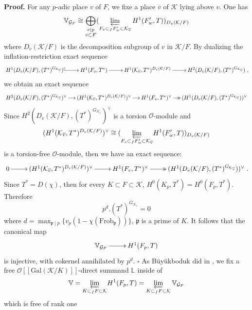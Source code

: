 \documentclass[reqno]{amsart}
\begin{document}
 \noindent \textbf{Proof.} For any $p$-adic place $v$ of $F$, we
fixe a place $\overline{v}$ of $\mathcal{K}$ lying above $v$.
One has
$$
\mathbb{V}_{\mathcal{G}_{F}}\cong\bigoplus_{\substack {v\mid p\\
v\subset F}} (\varprojlim_{F_{v}\subset_{f}F^{\prime}_{w}\subset
\mathcal{K}_{\overline{v}}}H^{1}(F^{\prime}_{w},T))_{D_{v}(\mathcal{K}/F)}
$$
where $D_{v}(\mathcal{K}/F)$ is the decomposition subgroup of $v$ in
$\mathcal{K}/F$. By dualizing the inflation-restriction exact
sequence
$$
\xymatrix@=2pc{H^{1}(D_{v}(\mathcal{K}/F),(T^{\ast})^{G_{\mathcal{K}_{\overline{v}}}})\ar@{^{(}->}[r]&H^{1}(F_{v},T^{\ast})\ar[r]&
H^{1}(\mathcal{K}_{\overline{v}},T^{\ast})^{D_{v}(\mathcal{K}/F)}\ar[r]&H^{2}(D_{v}(\mathcal{K}/F),(T^{\ast})^{G_{\mathcal{K}_{\overline{v}}}})},
$$
we obtain an exact sequence
$$
\xymatrix@=1pc{H^{2}(D_{v}(\mathcal{K}/F),(T^{\ast})^{G_{\mathcal{K}_{\overline{v}}}})^{\vee}\ar[r]&
(H^{1}(\mathcal{K}_{\overline{v}},T^{\ast})^{D_{v}(\mathcal{K}/F)})^{\vee}\ar[r]&
H^{1}(F_{v},T^{\ast})^{\vee}\ar@{->>}[r]&
(H^{1}(D_{v}(\mathcal{K}/F),(T^{\ast})^{G_{\mathcal{K}_{\overline{v}}}}))^{\vee}}
$$
Since
$H^{2}(D_{v}(\mathcal{K}/F),(T^{\ast})^{G_{\mathcal{K}_{\overline{v}}}})^{\vee}$
is a torsion $\mathcal{O}$-module and
$$
(H^{1}(\mathcal{K}_{\overline{v}},T^{\ast})^{D_{v}(\mathcal{K}/F)})^{\vee}\cong
(\displaystyle{\varprojlim_{ F_{v}\subset_{f}F^{\prime}_{w}\subset
\mathcal{K}_{\overline{v}}}}H^{1}(F^{\prime}_{w},T))_{D_{v}(\mathcal{K}/F)}
$$
is a torsion-free $\mathcal{O}$-module, then we have an exact
sequence:
$$
\xymatrix@=2pc{0\ar[r]&
(H^{1}(\mathcal{K}_{\overline{v}},T^{\ast})^{D_{v}(\mathcal{K}/F)})^{\vee}\ar[r]&
H^{1}(F_{v},T^{\ast})^{\vee}\ar@{->>}[r]&
(H^{1}(D_{v}(\mathcal{K}/F),(T^{\ast})^{G_{\mathcal{K}_{\overline{v}}}}))^{\vee}}.
$$
Since $T^{\ast}=D(\chi)$, then for every  $ K\subset F\subset
\mathcal{K}$, $ H^{0}(K_{p},T^{\ast})=H^{0}(F_{p},T^{\ast}).$
Therefore
$$
p^{d}.(T^{\ast})^{G_{\mathcal{K}_{\overline{v}}}}=0
$$
where $d=\displaystyle{\max_{\mathfrak{p}\mid
p}}\{v_{p}(1-\chi(\mathrm{Frob}_{\mathfrak{p}}))\}$, $\mathfrak{p}$
is a prime of $K$. It follows that the canonical map
$$
\xymatrix@=2pc{ \mathbb{V}_{\mathcal{G}_{F}}\ar[r]& H^{1}(F_{p},T)}
$$
is injective, with cokernel annihilated by $p^{d}$. \hfill
$\square$\vskip 6pt As  B\"{u}y\"{u}kboduk did in \cite{Kazim109},
we fix a free $\mathcal{O}[[\mathrm{Gal}(\mathcal{K}/K)]]$-direct
summand $\mathbb{L}$ inside of
$$\mathbb{V}=\displaystyle{\varprojlim_{K\subset_{f}F\subset
\mathcal{K}}}H^{1}(F_{p},T)= \varprojlim_{K\subset_{f}F\subset
\mathcal{K}}\mathbb{V}_{\mathcal{G}_{F}}$$ which is free of rank one
\end{document}
